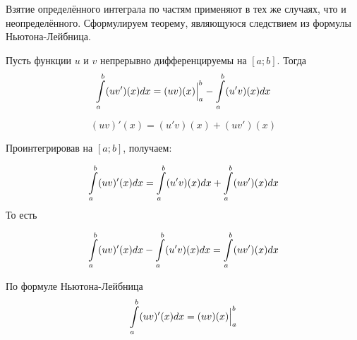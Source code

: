 Взятие определённого интеграла по частям применяют в тех же случаях, что и неопределённого.
Сформулируем теорему, являющуюся следствием из формулы Ньютона-Лейбница.

\begin{teorema}
Пусть функции $u$ и $v$ непрерывно дифференцируемы на $[a;b]$.
Тогда
$$
\int\limits_a^b (uv')(x) dx=(uv)(x)\Bigl.\Bigr|_a^b-\int\limits_a^b(u'v)(x)dx
$$
\end{teorema}

\dokvo
$$
(uv)'(x)=(u'v)(x)+(uv')(x)
$$

Проинтегрировав на $[a;b]$, получаем:

$$
\int\limits_a^b (uv)'(x)dx=\int\limits_a^b (u'v)(x) dx + \int\limits_a^b (uv')(x) dx
$$
То есть

$$
\int\limits_a^b (uv)'(x)dx-\int\limits_a^b (u'v)(x) dx = \int\limits_a^b (uv')(x) dx
$$


По формуле Ньютона-Лейбница
$$
\int\limits_a^b (uv)'(x)dx = (uv)(x)\Bigl.\Bigr|_a^b
$$

\dokno


